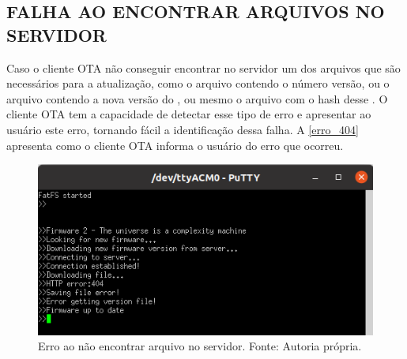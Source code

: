 \subsection{FALHA AO ENCONTRAR ARQUIVOS NO SERVIDOR}
Caso o cliente OTA não conseguir encontrar no servidor um dos arquivos que são necessários para a atualização, como o arquivo contendo o número versão, ou o arquivo contendo a nova versão do \firmware, ou mesmo o arquivo com o hash desse \firmware. O cliente OTA tem a capacidade de detectar esse tipo de erro e apresentar ao usuário este erro, tornando fácil a identificação dessa falha. A \autoref{erro_404} apresenta como o cliente OTA informa o usuário do erro que ocorreu.
\begin{figure}[H]
    \scriptsize
     \centering
     \includegraphics[scale=1.2]{dados/figuras/404.png}
     \caption{Erro ao não encontrar arquivo no servidor. \newline Fonte: Autoria própria.}
     \label{erro_404}
\end{figure}

